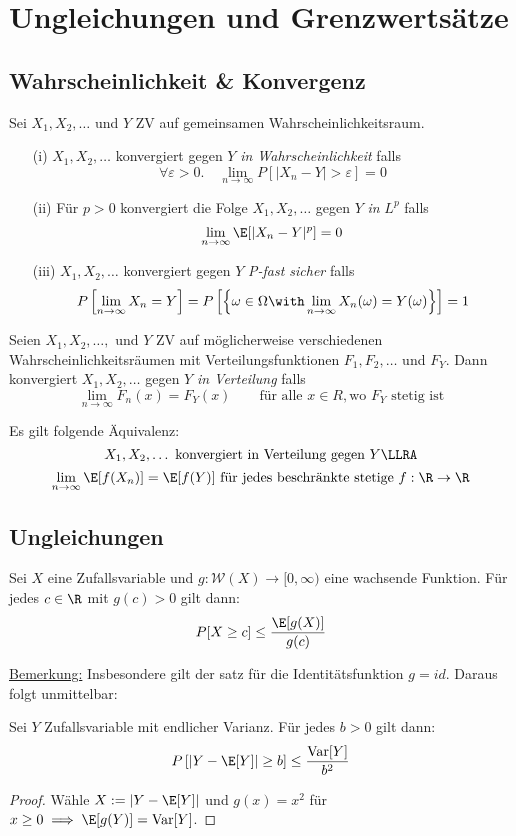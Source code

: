 \section{Ungleichungen und Grenzwertsätze}
\subsection{Wahrscheinlichkeit \& Konvergenz}
\begin{definition}
Sei $X_1,X_2,\dots$ und $Y$ ZV auf gemeinsamen Wahrscheinlichkeitsraum.
\begin{itemize}
\item[(i)] $X_1,X_2,\dots$ konvergiert gegen $Y$ \textit{in Wahrscheinlichkeit} falls $$\forall \varepsilon >0. \quad \lim_{n\to \infty} P[ |X_n -Y| > \varepsilon] = 0$$
\item[(ii)] Für $p>0$ konvergiert die Folge $X_1,X_2,\dots$ gegen $Y$ \textit{in} $L^p$ falls $$\lim_{n\to\infty} \E[ |X_n - Y|^p] = 0$$
\item[(iii)] $X_1,X_2,\dots$ konvergiert gegen $Y$ \textit{P-fast sicher} falls $$ P\left[ \lim_{n\to\infty} X_n = Y \right] = P \left[ \left \{ \omega \in \Omega \with \lim_{n\to\infty} X_n(\omega) = Y(\omega) \right \} \right] = 1$$
\end{itemize}
\end{definition}

\begin{definition}
Seien $X_1,X_2,\dots,$ und $Y$ ZV auf möglicherweise verschiedenen Wahrscheinlichkeitsräumen mit Verteilungsfunktionen $F_1,F_2,\dots$ und $F_Y$. Dann konvergiert $X_1,X_2, \dots$ gegen $Y$ \textit{in Verteilung} falls
$$ \lim_{n\to\infty} F_n(x) = F_Y(x) \quad \quad \mbox{für alle } x\in R, \mbox{wo } F_Y \mbox{ stetig ist}$$
\end{definition}

\begin{satz}
Es gilt folgende Äquivalenz:
$$ X_1,X_2,\dots \mbox{ konvergiert in Verteilung gegen } Y\LLRA$$ $$ \lim_{n\to\infty} \E[f(X_n)] = \E[f(Y)] \mbox{ für jedes beschränkte stetige } f:\R\to\R$$
\end{satz}
\subsection{Ungleichungen}
\begin{satz}
Sei $X$ eine Zufallsvariable und $g:\mathcal{W}(X)\to [0, \infty)$ eine wachsende Funktion. Für jedes $c \in \R$ mit $g(c) > 0$ gilt dann:
$$ P[X \geq c] \leq \frac{\E[g(X)]}{g(c)}$$
\end{satz}
\underline{Bemerkung:} Insbesondere gilt der satz für die Identitätsfunktion $g=id$. Daraus folgt unmittelbar:
\begin{satz}
Sei $Y$ Zufallsvariable mit endlicher Varianz. Für jedes $b>0$ gilt dann:
$$ P\left[ |Y-\E[Y]| \geq b \right] \leq \frac{\mathrm{Var}[Y]}{b^2}$$
\end{satz}
\begin{proof}
Wähle $X:=|Y-\E[Y]|$ und $g(x) =x^2 $ für $x\geq 0 \implies \E[g(Y)] = \mathrm{Var}[Y]$.
\end{proof}

